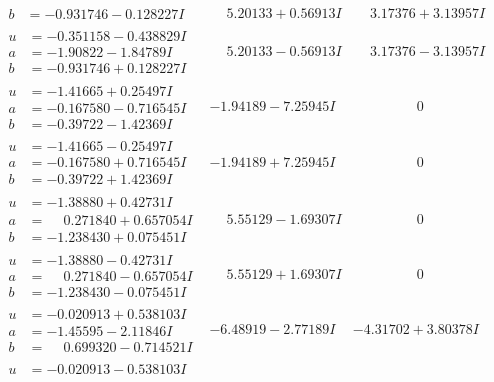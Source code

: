 \documentclass[1p]{elsarticle_modified}
\theoremstyle{definition}
\begin{document}
$$\begin{array}{c|c|c}
\begin{aligned}
b &= -0.931746 - 0.128227 I\end{aligned}
 & \phantom{-}5.20133 + 0.56913 I & \phantom{-}3.17376 + 3.13957 I \\ \hline\begin{aligned}
u &= -0.351158 - 0.438829 I \\
a &= -1.90822 - 1.84789 I \\
b &= -0.931746 + 0.128227 I\end{aligned}
 & \phantom{-}5.20133 - 0.56913 I & \phantom{-}3.17376 - 3.13957 I \\ \hline\begin{aligned}
u &= -1.41665 + 0.25497 I \\
a &= -0.167580 - 0.716545 I \\
b &= -0.39722 - 1.42369 I\end{aligned}
 & -1.94189 - 7.25945 I & \phantom{-0.000000 } 0 \\ \hline\begin{aligned}
u &= -1.41665 - 0.25497 I \\
a &= -0.167580 + 0.716545 I \\
b &= -0.39722 + 1.42369 I\end{aligned}
 & -1.94189 + 7.25945 I & \phantom{-0.000000 } 0 \\ \hline\begin{aligned}
u &= -1.38880 + 0.42731 I \\
a &= \phantom{-}0.271840 + 0.657054 I \\
b &= -1.238430 + 0.075451 I\end{aligned}
 & \phantom{-}5.55129 - 1.69307 I & \phantom{-0.000000 } 0 \\ \hline\begin{aligned}
u &= -1.38880 - 0.42731 I \\
a &= \phantom{-}0.271840 - 0.657054 I \\
b &= -1.238430 - 0.075451 I\end{aligned}
 & \phantom{-}5.55129 + 1.69307 I & \phantom{-0.000000 } 0 \\ \hline\begin{aligned}
u &= -0.020913 + 0.538103 I \\
a &= -1.45595 - 2.11846 I \\
b &= \phantom{-}0.699320 - 0.714521 I\end{aligned}
 & -6.48919 - 2.77189 I & -4.31702 + 3.80378 I \\ \hline\begin{aligned}
u &= -0.020913 - 0.538103 I \\

\end{aligned}
\end{array}$$
\end{document}
